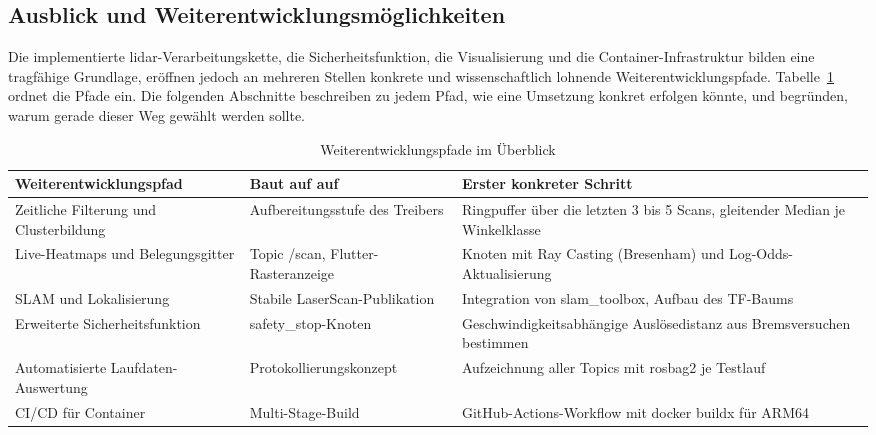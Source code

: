 \subsection{Ausblick und Weiterentwicklungsmöglichkeiten}
\label{sec:ausblick_sonia}
Die implementierte \gls{lidar}-Verarbeitungskette, die Sicherheitsfunktion, die Visualisierung und die Container-Infrastruktur bilden eine tragfähige Grundlage, eröffnen jedoch an mehreren Stellen konkrete und wissenschaftlich lohnende Weiterentwicklungspfade. Tabelle~\ref{tab:weiterentwicklungspfade} ordnet die Pfade ein. Die folgenden Abschnitte beschreiben zu jedem Pfad, wie eine Umsetzung konkret erfolgen könnte, und begründen, warum gerade dieser Weg gewählt werden sollte.
\begin{table}[h!]
    \centering
    \small
    \begin{tabular}{p{4.2cm} p{4.4cm} p{5.6cm}}
        \toprule
        \textbf{Weiterentwicklungspfad}        & \textbf{Baut auf auf}              & \textbf{Erster konkreter Schritt}                                            \\
        \midrule
        Zeitliche Filterung und Clusterbildung & Aufbereitungsstufe des Treibers    & Ringpuffer über die letzten 3 bis 5 Scans, gleitender Median je Winkelklasse \\
        Live-Heatmaps und Belegungsgitter      & Topic /scan, Flutter-Rasteranzeige & Knoten mit Ray Casting (Bresenham) und Log-Odds-Aktualisierung               \\
        SLAM und Lokalisierung                 & Stabile LaserScan-Publikation      & Integration von slam\_toolbox, Aufbau des TF-Baums                           \\
        Erweiterte Sicherheitsfunktion         & safety\_stop-Knoten                & Geschwindigkeitsabhängige Auslösedistanz aus Bremsversuchen bestimmen        \\
        Automatisierte Laufdaten-Auswertung    & Protokollierungskonzept            & Aufzeichnung aller Topics mit rosbag2 je Testlauf                            \\
        CI/CD für Container                    & Multi-Stage-Build                  & GitHub-Actions-Workflow mit docker buildx für ARM64                          \\
        \bottomrule
    \end{tabular}
    \caption{Weiterentwicklungspfade im Überblick}
    \label{tab:weiterentwicklungspfade}
\end{table}

